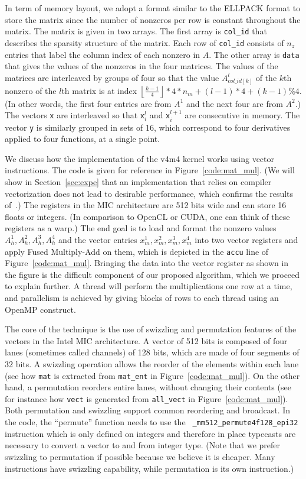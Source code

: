 \documentclass{sig-alternate}
\newcommand{\floor}[1]{\left\lfloor#1\right\rfloor}
\begin{document}
In term of memory layout, we adopt a format similar to the ELLPACK
format to store the matrix since the number of nonzeros per row is
constant throughout the matrix. The matrix is given in two arrays. The
first array is {\tt col\_id} that describes the
sparsity structure of the matrix. Each row of {\tt col\_id} consists
of $n_z$ entries that label the column index of each nonzero in
$A$. The other array is  {\tt data} that gives the values of
the nonzeros in the four matrices. The values of the matrices are
interleaved by groups of four so that the value $A^l_{col\_id[k]}$ of
the $k$th nonzero of the $l$th matrix is at index $\floor{\frac{k-1}{4}}*4*n_m + (l-1)*4+(k-1)\%4$.
(In other words, the first four entries are from $A^{1}$ and the 
next four are from $A^2$.) The vectors {\tt x} are
interleaved so that {\tt x}$^l_i$ and {\tt x}$^{l+1}_i$ are
consecutive in memory. The vector {\tt y} is similarly 
grouped in sets of 16, which correspond to four derivatives applied to
four functions, at a single point.


We discuss how the implementation of the v4m4 kernel works using
vector instructions. The code is given for reference in
Figure~\ref{code:mat_mul}. (We will show in Section~\ref{sec:expe}
that an implementation that relies on compiler vectorization does not lead
to desirable performance, which confirms the results
of~\cite{Saule13-ARXIV}.) The registers in the MIC architecture are
512 bits wide and can store 16 floats or integers. (In comparison to
OpenCL or CUDA, one can think of these registers as a warp.) The end
goal is to load and format the nonzero values $A_h^1,A_h^2,A_h^3,A_h^4$
and the vector entries $x_m^1,x_m^2,x_m^3,x_m^4$ into two vector registers and 
apply Fused Multiply-Add on them, which is depicted in the {\tt accu} line of 
Figure~\ref{code:mat_mul}. Bringing the data into the vector
register as shown in the figure is the difficult component of our 
proposed algorithm, which we proceed to explain further. 
A thread will perform the multiplications one row at a time,
and parallelism is achieved by giving blocks of rows to each thread
using an OpenMP construct.


The core of the technique is the use of swizzling and permutation
features of the vectors in the Intel MIC architecture. A vector of 512
bits is composed of four lanes (sometimes called channels) of 128
bits, which are made of four segments of 32 bits. A swizzling
operation allows the reorder of the elements within each lane (see how
{\tt mat} is extracted from {\tt mat\_ent} in
Figure~\ref{code:mat_mul}). On the other hand, a permutation reorders entire lanes,
without changing their contents (see for instance how {\tt vect} is
generated from {\tt all\_vect} in Figure~\ref{code:mat_mul}).  Both
permutation and swizzling support common reordering and broadcast. In
the code, the ``permute'' function needs to use the {\tt
  \_mm512\_permute4f128\_epi32} instruction which is only defined on
integers and therefore in place typecasts are necessary to convert
a vector to and from integer type.  (Note that we prefer swizzling to
permutation if possible because we believe it is cheaper. Many
instructions have swizzling capability, while permutation is its own
instruction.)
\end{document}
